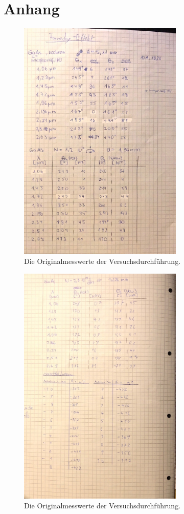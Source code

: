 \newpage
\section{Anhang}

\begin{figure}[h]
   \centering
   \includegraphics[width=0.7\textwidth]{latex/images/faraday1.pdf}
   \caption{Die Originalmesswerte der Versuchsdurchführung.}
   \label{img:mess1}
\end{figure}
 
\begin{figure}[h]
   \centering
   \includegraphics[width=0.7\textwidth]{latex/images/faraday2.pdf}
   \caption{Die Originalmesswerte der Versuchsdurchführung.}
\end{figure}
